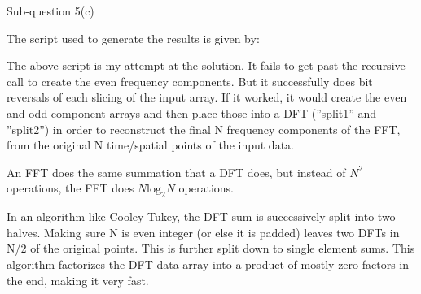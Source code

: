 
\begin{subsection}{Sub-question 5(c)}

The script used to generate the results is given by:
  



The above script is my attempt at the solution. It fails to get past the recursive call to create the even frequency components. But it successfully does bit reversals of each slicing of the input array. If it worked, it would create the even and odd component arrays and then place those into a DFT (''split1'' and ''split2'') in order to reconstruct the final N frequency components of the FFT, from the original N time/spatial points of the input data.

An FFT does the same summation that a DFT does, but instead of $N^2$ operations, the FFT does $N\text{log}_2N$ operations.

In an algorithm like Cooley-Tukey, the DFT sum is successively split into two halves. Making sure N is even integer (or else it is padded) leaves two DFTs in N/2 of the original points. This is further split down to single element sums. This algorithm factorizes the DFT data array into a product of mostly zero factors in the end, making it very fast.

\end{subsection}